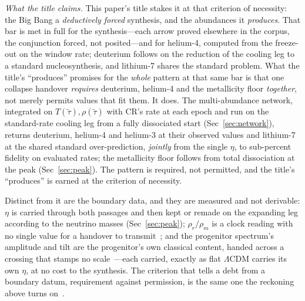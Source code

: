 \documentclass[11pt,a4paper]{article}
\theoremstyle{plain}
\theoremstyle{definition}
\theoremstyle{remark}
\begin{document}
\emph{What the title claims.} This paper's title stakes it at that criterion of
necessity: the Big Bang a \emph{deductively forced} synthesis, and the abundances it
\emph{produces}. That bar is met in full for the synthesis---each arrow proved elsewhere in the
corpus, the conjunction forced, not posited---and for helium-4, computed from the freeze-out on
the window rate; deuterium follows on the reduction of the cooling leg to a standard
nucleosynthesis, and lithium-7 shares the standard problem. What the title's ``produces'' promises for the \emph{whole} pattern at that same bar is that one
collapse handover \emph{requires} deuterium, helium-4 and the metallicity floor \emph{together}, not
merely permits values that fit them. It does. The multi-abundance network, integrated on
$T(\tilde\tau),\rho(\tilde\tau)$ with CR's rate at each epoch and run on the standard-rate cooling
leg from a fully dissociated start (Sec~\ref{sec:network}), returns deuterium, helium-4 and helium-3
at their observed values and lithium-7 at the shared standard over-prediction, \emph{jointly} from
the single $\eta$, to sub-percent fidelity on evaluated rates; the metallicity floor
follows from total dissociation at the peak (Sec~\ref{sec:peak}). The pattern is required, not
permitted, and the title's ``produces'' is earned at the criterion of necessity.

Distinct
from it are the boundary data, and they are measured and not derivable: $\eta$ is carried
through both passages and then kept or remade on the expanding leg according to the neutrino masses (Sec~\ref{sec:peak}); $\rho_r/\rho_m$ is a clock reading with no single
value for a handover to transmit~\cite{JanzenGeometricCore}; and the progenitor spectrum's amplitude and tilt
are the progenitor's own classical content, handed across a crossing that stamps no
scale~\cite{JanzenCRcosmology}---each carried, exactly as flat $\Lambda$CDM carries its own $\eta$, at no
cost to the synthesis. The criterion that tells a debt from a boundary datum, requirement against permission, is the
same one the reckoning above turns on~\cite{JanzenShadowExistence}.


\end{document}
